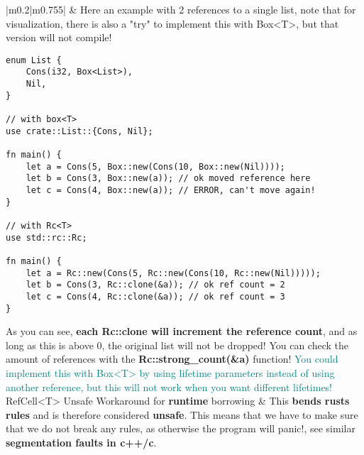 \documentclass[main.tex,fontsize=8pt,paper=a4,paper=portrait,DIV=calc,]{scrartcl}
\begin{document}
\pagebreak
\begin{table}[ht!]
\begin{tabular}{|m{0.2\linewidth}|m{0.755\linewidth}|}
\hline
&
Here an example with 2 references to a single list, note that for visualization, there is also a "try" to implement this with Box<T>, but that version will not compile!\newline
\begin{lstlisting}
enum List {
    Cons(i32, Box<List>),
    Nil,
}

// with box<T>
use crate::List::{Cons, Nil};

fn main() {
    let a = Cons(5, Box::new(Cons(10, Box::new(Nil))));
    let b = Cons(3, Box::new(a)); // ok moved reference here
    let c = Cons(4, Box::new(a)); // ERROR, can't move again!
}

// with Rc<T>
use std::rc::Rc;

fn main() {
    let a = Rc::new(Cons(5, Rc::new(Cons(10, Rc::new(Nil)))));
    let b = Cons(3, Rc::clone(&a)); // ok ref count = 2
    let c = Cons(4, Rc::clone(&a)); // ok ref count = 3
}
\end{lstlisting}
As you can see, \textbf{each Rc::clone will increment the reference count}, and as long as this is above 0, the original list will not be dropped!\newline
\textcolor{OliveGreen}{You can check the amount of references with the \textbf{Rc::strong\_count(\&a)} function!}\newline
\textcolor{teal}{You could implement this with Box<T> by using lifetime parameters instead of using another reference, but this will not work when you want different lifetimes!}\\
\hline
RefCell<T> Unsafe Workaround for \textbf{runtime} borrowing &
This \textbf{bends rusts rules} and is therefore considered \textbf{unsafe}.\newline
This means that we have to make sure that we do not break any rules, as otherwise the program will panic!, see similar \textbf{segmentation faults in c++/c}.\newline


\end{tabular}
\end{table}
\end{document}
